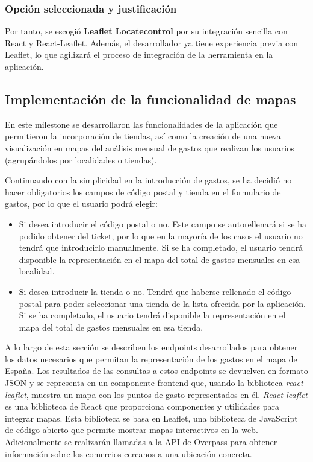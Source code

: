 \subsubsection{Opción seleccionada y justificación}
Por tanto, se escogió \textbf{Leaflet Locatecontrol} por su integración sencilla con React y React-Leaflet. Además, el desarrollador ya tiene experiencia previa con Leaflet, lo que agilizará el proceso de integración de la herramienta en la aplicación.





\subsection{Implementación de la funcionalidad de mapas}
En este milestone se desarrollaron las funcionalidades de la aplicación que permitieron la incorporación de tiendas, así como la creación de una nueva visualización en mapas del análisis mensual de gastos que realizan los usuarios (agrupándolos por localidades o tiendas).

Continuando con la simplicidad en la introducción de gastos, se ha decidió no hacer obligatorios los campos de código postal y tienda en el formulario de gastos, por lo que el usuario podrá elegir:

\begin{itemize}
    \item Si desea introducir el código postal o no. Este campo se autorellenará si se ha podido obtener del ticket, por lo que en la mayoría de los casos el usuario no tendrá que introducirlo manualmente. Si se ha completado, el usuario tendrá disponible la representación en el mapa del total de gastos mensuales en esa localidad. 
    
    \item Si desea introducir la tienda o no. Tendrá que haberse rellenado el código postal para poder seleccionar una tienda de la lista ofrecida por la aplicación. Si se ha completado, el usuario tendrá disponible la representación en el mapa del total de gastos mensuales en esa tienda.
\end{itemize}

A lo largo de esta sección se describen los endpoints desarrollados para obtener los datos necesarios que permitan la representación de los gastos en el mapa de España. Los resultados de las consultas a estos endpoints se devuelven en formato JSON y se representa en un componente frontend que, usando la biblioteca \textit{react-leaflet}, muestra un mapa con los puntos de gasto representados en él. \textit{React-leaflet} es una biblioteca de React que proporciona componentes y utilidades para integrar mapas. Esta biblioteca se basa en Leaflet, una biblioteca de JavaScript de código abierto que permite mostrar mapas interactivos en la web. Adicionalmente se realizarán llamadas a la API de Overpass para obtener información sobre los comercios cercanos a una ubicación concreta.


